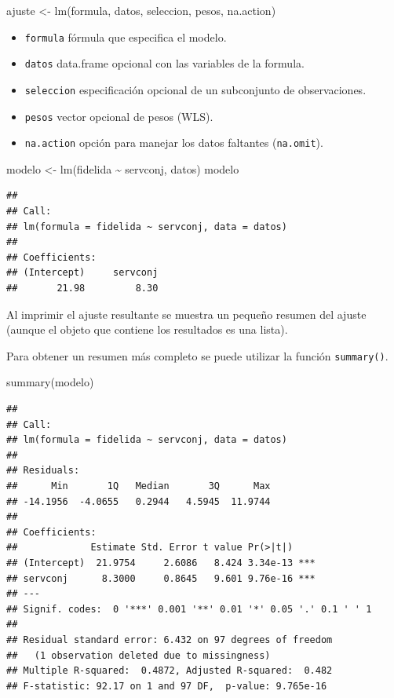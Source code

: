 \documentclass[
]{book}
\newenvironment{Shaded}{\begin{snugshade}}{\end{snugshade}}
\newcommand{\FunctionTok}[1]{\textcolor[rgb]{0.00,0.00,0.00}{#1}}
\newcommand{\NormalTok}[1]{#1}
\newcommand{\OtherTok}[1]{\textcolor[rgb]{0.56,0.35,0.01}{#1}}
\newcommand{\SpecialCharTok}[1]{\textcolor[rgb]{0.00,0.00,0.00}{#1}}
\providecommand{\tightlist}{%
  \setlength{\itemsep}{0pt}\setlength{\parskip}{0pt}}
\theoremstyle{break}
\theoremstyle{nonumberplain}
\begin{document}
\begin{Shaded}
\begin{Highlighting}[]
\NormalTok{ajuste }\OtherTok{\textless{}{-}} \FunctionTok{lm}\NormalTok{(formula, datos, seleccion, pesos, na.action)}
\end{Highlighting}
\end{Shaded}

\begin{itemize}
\tightlist
\item
  \texttt{formula} fórmula que especifica el modelo.
\item
  \texttt{datos} data.frame opcional con las variables de la formula.
\item
  \texttt{seleccion} especificación opcional de un subconjunto de observaciones.
\item
  \texttt{pesos} vector opcional de pesos (WLS).
\item
  \texttt{na.action} opción para manejar los datos faltantes (\texttt{na.omit}).
\end{itemize}

\begin{Shaded}
\begin{Highlighting}[]
\NormalTok{modelo }\OtherTok{\textless{}{-}} \FunctionTok{lm}\NormalTok{(fidelida }\SpecialCharTok{\textasciitilde{}}\NormalTok{ servconj, datos)}
\NormalTok{modelo}
\end{Highlighting}
\end{Shaded}

\begin{verbatim}
## 
## Call:
## lm(formula = fidelida ~ servconj, data = datos)
## 
## Coefficients:
## (Intercept)     servconj  
##       21.98         8.30
\end{verbatim}

Al imprimir el ajuste resultante se muestra un pequeño resumen del ajuste (aunque el objeto que contiene los resultados es una lista).

Para obtener un resumen más completo se puede utilizar la función \texttt{summary()}.

\begin{Shaded}
\begin{Highlighting}[]
\FunctionTok{summary}\NormalTok{(modelo)}
\end{Highlighting}
\end{Shaded}

\begin{verbatim}
## 
## Call:
## lm(formula = fidelida ~ servconj, data = datos)
## 
## Residuals:
##      Min       1Q   Median       3Q      Max 
## -14.1956  -4.0655   0.2944   4.5945  11.9744 
## 
## Coefficients:
##             Estimate Std. Error t value Pr(>|t|)    
## (Intercept)  21.9754     2.6086   8.424 3.34e-13 ***
## servconj      8.3000     0.8645   9.601 9.76e-16 ***
## ---
## Signif. codes:  0 '***' 0.001 '**' 0.01 '*' 0.05 '.' 0.1 ' ' 1
## 
## Residual standard error: 6.432 on 97 degrees of freedom
##   (1 observation deleted due to missingness)
## Multiple R-squared:  0.4872, Adjusted R-squared:  0.482 
## F-statistic: 92.17 on 1 and 97 DF,  p-value: 9.765e-16
\end{verbatim}
\end{document}
